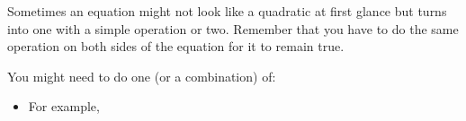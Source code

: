         \label{m39247*id150788}Sometimes an equation might not look like a quadratic at first glance but
turns into one with a simple operation or two. Remember that you have to do the same operation on both sides of the equation for it to remain true.\par 
        \label{m39247*id150793}You might need to do one (or a combination) of:\par 
        \label{m39247*id150797}\begin{itemize}[noitemsep]
            \label{m39247*uid40}\item For example,
\label{m39247*id150815}\nopagebreak\noindent{}

\end{itemize}
